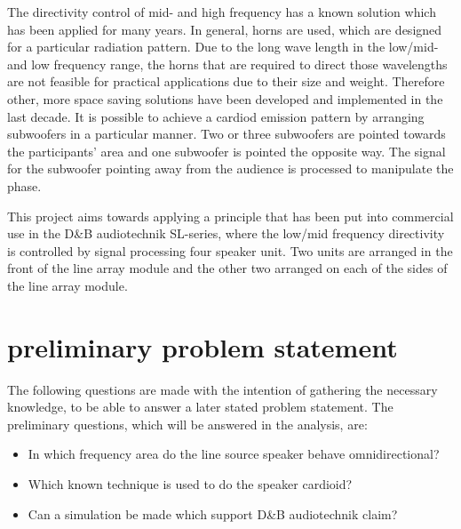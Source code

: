 The directivity control of mid- and high frequency has a known solution which has been applied for many years. In general, horns are used, which are designed for a particular radiation pattern. Due to the long wave length in the low/mid- and low frequency range, the horns that are required to direct those wavelengths are not feasible for practical applications due to their size and weight. Therefore other, more space saving solutions have been developed and implemented in the last decade. It is possible to achieve a cardiod emission pattern by arranging subwoofers in a particular manner. Two or three subwoofers are pointed towards the participants' area and one subwoofer is pointed the opposite way. The signal for the subwoofer pointing away from the audience is processed to manipulate the phase.


This project aims towards applying a principle that has been put into commercial use in the D\&B audiotechnik SL-series, where the low/mid frequency directivity is controlled by signal processing four speaker unit. Two units are arranged in the front of the line array module and the other two arranged on each of the sides of the line array module.



\section{preliminary problem statement}
The following questions are made with the intention of gathering the necessary knowledge, to be able to answer a later stated problem statement. The preliminary questions, which will be answered in the analysis, are:

\begin{itemize}
\item In which frequency area do the line source speaker behave omnidirectional?
\item Which known technique is used to do the speaker cardioid?
\item Can a simulation be made which support D\&B audiotechnik claim?
\end{itemize}



